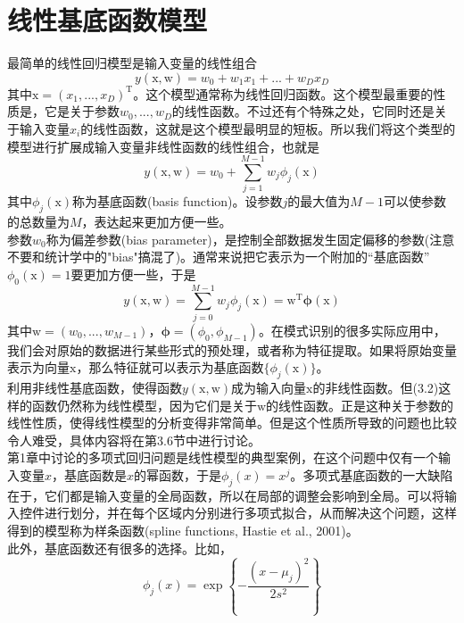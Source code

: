 \documentclass[b5paper]{book}
\numberwithin{equation}{chapter}
\newcommand {\bx} {\boldsymbol{\mathrm{x}}}
\newcommand {\bw} {\boldsymbol{\mathrm{w}}}
\newcommand {\rmT} {\mathrm{T}}
\newcommand {\bfphi} {\boldsymbol{\phi}}
\newcommand {\insertline} {\noindent{\color{red} \rule[5pt]{\textwidth}{0.1em}}}
\begin{document}
	\section{线性基底函数模型}
	\insertline
	\textnormal{
	\indent 最简单的线性回归模型是输入变量的线性组合
	\begin{equation}
		y(\bx,\bw) = w_0+w_1x_1+...+w_D x_D
	\end{equation}
	其中$\bx=(x_1,...,x_D)^{\rmT}$。这个模型通常称为线性回归函数。这个模型最重要的性质是，它是关于参数$w_0,...,w_D$的线性函数。不过还有个特殊之处，它同时还是关于输入变量$x_i$的线性函数，这就是这个模型最明显的短板。所以我们将这个类型的模型进行扩展成输入变量非线性函数的线性组合，也就是
	\begin{equation}
		y(\bx,\bw)=w_0 + \sum_{j=1}^{M-1}w_j \phi_j(\bx)
	\end{equation}
	其中$\phi_j(\bx)$称为基底函数(basis function)。设参数$j$的最大值为$M-1$可以使参数的总数量为$M$，表达起来更加方便一些。\\
	\indent 参数$w_0$称为偏差参数(bias parameter)，是控制全部数据发生固定偏移的参数(注意不要和统计学中的"bias"搞混了)。通常来说把它表示为一个附加的“基底函数”$\phi_0(\bx)=1$要更加方便一些，于是
	\begin{equation}
		y(\bx,\bw)=\sum_{j=0}^{M-1}w_j \phi_j(\bx) = \bw^{\rmT} \bfphi(\bx)
	\end{equation}
	其中$\bw=(w_0,...,w_{M-1})$，$\bfphi = (\phi_0,\phi_{M-1})$。在模式识别的很多实际应用中，我们会对原始的数据进行某些形式的预处理，或者称为特征提取。如果将原始变量表示为向量$\bx$，那么特征就可以表示为基底函数$\{\phi_j(\bx)\}$。\\
	\indent 利用非线性基底函数，使得函数$y(\bx,\bw)$成为输入向量$\bx$的非线性函数。但(3.2)这样的函数仍然称为线性模型，因为它们是关于$\bw$的线性函数。正是这种关于参数的线性性质，使得线性模型的分析变得非常简单。但是这个性质所导致的问题也比较令人难受，具体内容将在第3.6节中进行讨论。\\
	\indent 第1章中讨论的多项式回归问题是线性模型的典型案例，在这个问题中仅有一个输入变量$x$，基底函数是$x$的幂函数，于是$\phi_j(x)=x^j$。多项式基底函数的一大缺陷在于，它们都是输入变量的全局函数，所以在局部的调整会影响到全局。可以将输入控件进行划分，并在每个区域内分别进行多项式拟合，从而解决这个问题，这样得到的模型称为样条函数(spline functions, Hastie et al., 2001)。\\
	\indent 此外，基底函数还有很多的选择。比如，
	\begin{equation}
		\phi_j(x)=\exp\left\{-\frac{(x-\mu_j)^2}{2s^2}\right\}
	\end{equation}
}
\end{document}

